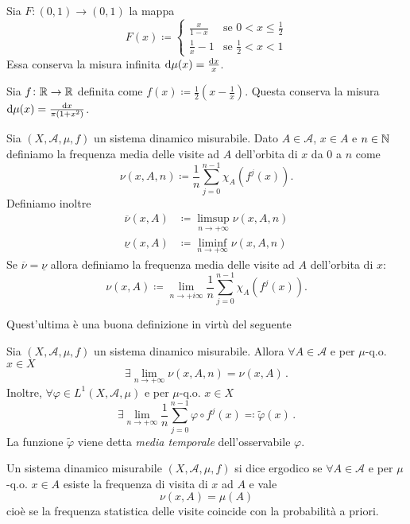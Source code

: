 \begin{exercise}
    Sia $ F\colon (0,1)\to (0,1) $ la mappa
    \[
        F(x) \coloneqq
        \begin{cases}
            \frac{x}{1-x}   & \text{se } 0 < x \leq \frac{1}{2} \\
            \frac{1}{x} - 1 & \text{se } \frac{1}{2} < x < 1
        \end{cases}
    \]
    Essa conserva la misura infinita $ \dif{\mu}(x) = \frac{\dif{x}}{x} $.
\end{exercise}

\begin{exercise}
    Sia $ f\colon \mathbb{R}\to\mathbb{R} $ definita come $ f(x) \coloneqq \frac{1}{2} \left( x - \frac{1}{x} \right) $. Questa conserva la misura $ \dif{\mu}(x) = \frac{\dif{x}}{\pi(1+x^2)} $.
\end{exercise}

\begin{definition}
    Sia $ (X, \mathcal{A}, \mu, f) $ un sistema dinamico misurabile. Dato $ A \in \mathcal{A} $, $ x \in A $ e $ n \in \mathbb{N} $ definiamo la frequenza media delle visite ad $ A $ dell'orbita di $ x $ da $ 0 $ a $ n $ come
    \[
        \nu(x, A, n) \coloneqq \frac{1}{n} \sum_{j = 0}^{n-1} \chi_A(f^{j}(x)).
    \]
    Definiamo inoltre
    \begin{align*}
        \overline{\nu}(x, A) & \coloneqq \limsup_{n \to +\infty} \nu(x, A, n) \\
        \underline{\nu}(x, A) & \coloneqq \liminf_{n \to +\infty} \nu(x, A, n)
    \end{align*}
    Se $ \overline{\nu} = \underline{\nu} $ allora definiamo la frequenza media delle visite ad $ A $ dell'orbita di $ x $:
    \[
        \nu(x, A) \coloneqq \lim_{n \to +i\infty} \frac{1}{n} \sum_{j = 0}^{n-1} \chi_A(f^{j}(x)).
    \]
\end{definition}
Quest'ultima è una buona definizione in virtù del seguente
\begin{thm}[Birkhoff]
    Sia $ (X,\mathcal{A},\mu,f) $ un sistema dinamico misurabile. Allora $ \forall A\in\mathcal{A} $ e per $ \mu $-q.o. $ x\in X $
    \[ \exists \lim_{n \to +\infty} \nu(x,A,n) = \nu(x,A) \, . \]
    Inoltre, $ \forall \varphi \in L^1(X,\mathcal{A},\mu) $ e per $ \mu $-q.o. $ x\in X $
    \[ \exists \lim_{n \to +\infty} \frac{1}{n} \sum_{j=0}^{n-1} \varphi\circ f^j(x) \eqqcolon \tilde{\varphi}(x) \, . \]
    La funzione $ \tilde{\varphi} $ viene detta \emph{media temporale} dell'osservabile $ \varphi $.
\end{thm}

\begin{definition}
    Un sistema dinamico misurabile $ (X, \mathcal{A}, \mu, f) $ si dice ergodico se $ \forall A \in \mathcal{A} $ e per $ \mu $-q.o. $ x \in A $ esiste la frequenza di visita di $ x $ ad $ A $ e vale
    \[
        \nu(x, A) = \mu(A)
    \]
    cioè se la frequenza statistica delle visite coincide con la probabilità a priori. 
\end{definition}
